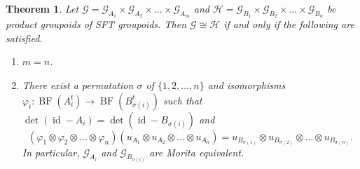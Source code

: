 \documentclass[11pt]{article}
\newtheorem{theorem}{Theorem}[section]
\theoremstyle{definition}
\numberwithin{equation}{section}
\renewcommand{\phi}{\varphi}
\newcommand{\BF}{\operatorname{BF}}
\newcommand{\id}{\operatorname{id}}
\newcommand{\G}{\mathcal{G}}
\renewcommand{\H}{\mathcal{H}}
\begin{document}
\begin{theorem}\label{prodSFTclassify}
Let $\G=\G_{A_1}\times\G_{A_2}\times\dots\times\G_{A_m}$ and 
$\H=\G_{B_1}\times\G_{B_2}\times\dots\times\G_{B_n}$ be 
product groupoids of SFT groupoids. 
Then $\G\cong\H$ if and only if the following are satisfied. 
\begin{enumerate}
\item $m=n$. 
\item There exist a permutation $\sigma$ of $\{1,2,\dots,n\}$ and 
isomorphisms $\phi_i:\BF(A_i^t)\to\BF(B_{\sigma(i)}^t)$ 
such that $\det(\id-A_i)=\det(\id-B_{\sigma(i)})$ and 
\[
(\phi_1\otimes\phi_2\otimes\dots\otimes\phi_n)
(u_{A_1}\otimes u_{A_2}\otimes\dots\otimes u_{A_n})
=u_{B_{\sigma(1)}}\otimes u_{B_{\sigma(2)}}\otimes\dots
\otimes u_{B_{\sigma(n)}}. 
\]
In particular, 
$\G_{A_i}$ and $\G_{B_{\sigma(i)}}$ are Morita equivalent. 
\end{enumerate}
\end{theorem}
\end{document}
